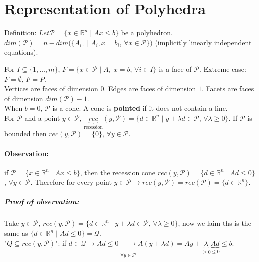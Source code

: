 \documentclass[main]{subfiles}
\begin{document}

\section{Representation of Polyhedra}
Definition: $Let \mathcal{P} = \{x \in \mathbb{R}^n \mid Ax \leq b\}$ be a 
polyhedron. $dim(\mathcal{P}) = n - dim(\{A_{i\cdot} \mid A_{i\cdot}x = b_i$, $
\forall x \in \mathcal{P} \})$ (implicitly linearly independent equations).

For $I \subseteq \{1, \dots, m\}$, $F = \{ x \in \mathcal{P} \mid A_{i\cdot} x = 
b$, $\forall i \in I \}$ is a face of $\mathcal{P}$.
Extreme case: $F = \emptyset$, $F = P$.\\

Vertices are faces of dimension $0$. Edges are faces of dimension $1$. Facets 
are faces of dimension $dim(\mathcal{P})-1$.\\

When $b = 0$, $\mathcal{P}$ is a cone. A cone is \textbf{pointed} if it does not 
contain a line.\\

For $\mathcal{P}$ and a point $y \in \mathcal{P}$, $\underbrace{rec}
_{\text{recession}}(y, \mathcal{P}) = \{ d \in \mathbb{R}^n \mid y + \lambda d 
\in \mathcal{P}$, $\forall \lambda \geq 0 \}$. If $\mathcal{P}$ is bounded then 
$rec(y, \mathcal{P}) = \{ 0 \}$, $\forall y \in \mathcal{P}$. \\

\paragraph{Observation:}
if $\mathcal{P} = \{x \in \mathbb{R}^n \mid Ax \leq b \}$, then the recession
cone $rec(y, \mathcal{P}) = \{d \in \mathbb{R}^n \mid Ad \leq 0 \}$, $\forall y
\in \mathcal{P}$. Therefore for every point $y \in \mathcal{P} \rightarrow
rec(y, \mathcal{P}) = rec(\mathcal{P}) = \{ d \in \mathbb{R}^n \}$.

\subparagraph{Proof of observation:}
Take $y \in \mathcal{P}$, $rec(y, \mathcal{P}) = \{d \in \mathbb{R}^n \mid y +
\lambda d \in \mathcal{P}$, $\forall \lambda \geq 0 \}$, now we laim ths is the
same as $\{d \in \mathbb{R}^n \mid Ad \leq 0 \} = \mathcal{Q}$.\\

"$Q \subseteq rec(y, \mathcal{P})$": if $d \in \mathcal{Q} \rightarrow Ad \leq
0 \underbrace{\rightarrow}_{\forall y \in \mathcal{P}} A (y + \lambda d) = Ay +
\underbrace{\lambda}_{\geq 0} \underbrace{A d}_{\leq 0} \leq b$. \\
\end{document}

